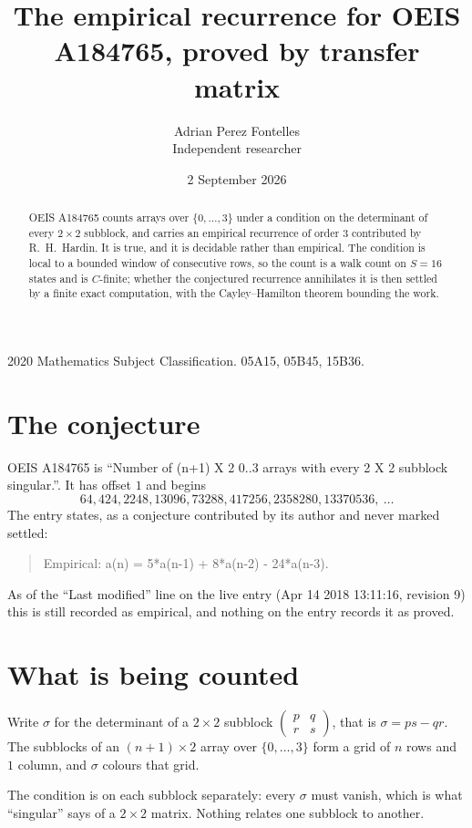 \documentclass[11pt,a4paper]{article}
\title{The empirical recurrence for OEIS A184765, proved by transfer matrix}
\author{Adrian Perez Fontelles\\ \small Independent researcher}
\date{2 September 2026}
\theoremstyle{plain}
\theoremstyle{definition}
\begin{document}
\maketitle

\begin{abstract}
OEIS A184765 counts arrays over $\{0,\dots,3\}$ under a condition on the determinant of every
$2\times2$ subblock, and carries an empirical recurrence of order $3$ contributed by
R.~H.~Hardin. It is true, and it is decidable rather than empirical. The condition is local to
a bounded window of consecutive rows, so the count is a walk count on $S=16$ states and is
$C$-finite; whether the conjectured recurrence annihilates it is then settled by a finite exact
computation, with the Cayley--Hamilton theorem bounding the work.
\end{abstract}

\noindent\small 2020 Mathematics Subject Classification. 05A15, 05B45, 15B36.\normalsize

\section{The conjecture}

OEIS A184765 is ``Number of (n+1) X 2 0..3 arrays with every 2 X 2 subblock singular.''. It has offset $1$ and begins
\[
64, 424, 2248, 13096, 73288, 417256, 2358280, 13370536,\ \dots
\]
The entry states, as a conjecture contributed by its author and never marked settled:
\begin{quote}
Empirical: a(n) = 5*a(n-1) + 8*a(n-2) - 24*a(n-3).
\end{quote}
As of the ``Last modified'' line on the live entry (Apr 14 2018 13:11:16, revision 9) this is still
recorded as empirical, and nothing on the entry records it as proved.

\section{What is being counted}

Write $\sigma$ for the determinant of a $2\times2$ subblock
$\begin{pmatrix}p&q\\r&s\end{pmatrix}$, that is $\sigma=ps-qr$. The subblocks of an
$(n+1)\times2$ array over $\{0,\dots,3\}$ form a grid of $n$ rows and $1$
column, and $\sigma$ colours that grid.

The condition is on each subblock separately: every $\sigma$ must vanish, which is what
``singular'' says of a $2\times2$ matrix. Nothing
relates one subblock to another.
\end{document}
